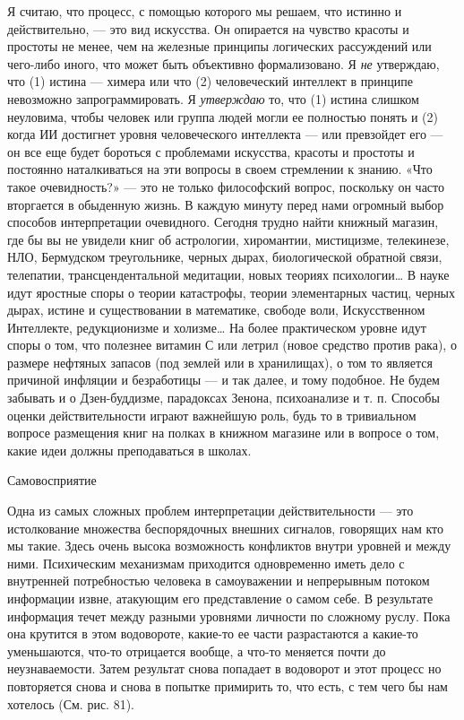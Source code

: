 Я считаю, что процесс, с помощью которого мы решаем, что истинно и действительно, --- это вид искусства. Он опирается на чувство красоты и простоты не менее, чем на железные принципы логических рассуждений или чего-либо иного, что может быть объективно формализовано. Я \emph{не} утверждаю, что (1) истина --- химера или что (2) человеческий интеллект в принципе невозможно запрограммировать. Я \emph{утверждаю} то, что (1) истина слишком неуловима, чтобы человек или группа людей могли ее полностью понять и (2) когда ИИ достигнет уровня человеческого интеллекта --- или превзойдет его --- он все еще будет бороться с проблемами искусства, красоты и простоты и постоянно наталкиваться на эти вопросы в своем стремлении к знанию. «Что такое очевидность?» --- это не только философский вопрос, поскольку он часто вторгается в обыденную жизнь. В каждую минуту перед нами огромный выбор способов интерпретации очевидного. Сегодня трудно найти книжный магазин, где бы вы не увидели книг об астрологии, хиромантии, мистицизме, телекинезе, НЛО, Бермудском треугольнике, черных дырах, биологической обратной связи, телепатии, трансцендентальной медитации, новых теориях психологии\ldots{} В науке идут яростные споры о теории катастрофы, теории элементарных частиц, черных дырах, истине и существовании в математике, свободе воли, Искусственном Интеллекте, редукционизме и холизме\ldots{} На более практическом уровне идут споры о том, что полезнее витамин С или летрил (новое средство против рака), о размере нефтяных запасов (под землей или в хранилищах), о том то является причиной инфляции и безработицы --- и так далее, и тому подобное. Не будем забывать и о Дзен-буддизме, парадоксах Зенона, психоанализе и т. п. Способы оценки действительности играют важнейшую роль, будь то в тривиальном вопросе размещения книг на полках в книжном магазине или в вопросе о том, какие идеи должны преподаваться в школах.

Самовосприятие

Одна из самых сложных проблем интерпретации действительности --- это истолкование множества беспорядочных внешних сигналов, говорящих нам кто мы такие. Здесь очень высока возможность конфликтов внутри уровней и между ними. Психическим механизмам приходится одновременно иметь дело с внутренней потребностью человека в самоуважении и непрерывным потоком информации извне, атакующим его представление о самом себе. В результате информация течет между разными уровнями личности по сложному руслу. Пока она крутится в этом водовороте, какие-то ее части разрастаются а какие-то уменьшаются, что-то отрицается вообще, а что-то меняется почти до неузнаваемости. Затем результат снова попадает в водоворот и этот процесс но повторяется снова и снова в попытке примирить то, что есть, с тем чего бы нам хотелось (См. рис. 81).

